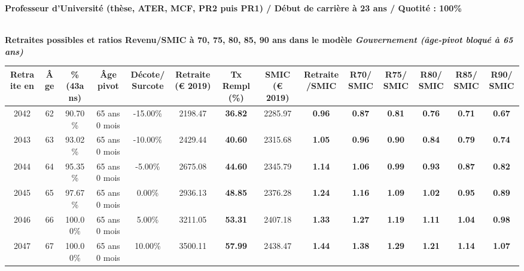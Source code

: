 {\bf \noindent Professeur d'Université (thèse, ATER, MCF, PR2 puis PR1) / Début de carrière à 23 ans / Quotité : 100\%}  ~ 

 ~\\{\bf \noindent Retraites possibles et ratios Revenu/SMIC à 70, 75, 80, 85, 90 ans dans le modèle \emph{Gouvernement (âge-pivot bloqué à 65 ans)}}  
 
\begin{adjustbox}{max width=\textwidth} 
\begin{tabular}[htb]{|c|c||c|c|c||c|c||c|c||c|c|c|c|c|} 
\hline 
 Retraite en &  Âge &  \%(43ans) &  Âge pivot &  Décote/Surcote &  Retraite (\euro{} 2019) &  Tx Rempl(\%) &  SMIC (\euro{} 2019) &  Retraite/SMIC &  R70/SMIC &  R75/SMIC &  R80/SMIC &  R85/SMIC &  R90/SMIC \\ 
\hline \hline 
 2042 &  62 &  90.70\% &  65 ans 0 mois &  -15.00\% &  2198.47 &  {\bf 36.82} &  2285.97 &  {\bf {\color{red} 0.96}} &  {\bf {\color{red} 0.87}} &  {\bf {\color{red} 0.81}} &  {\bf {\color{red} 0.76}} &  {\bf {\color{red} 0.71}} &  {\bf {\color{red} 0.67}} \\ 
\hline 
 2043 &  63 &  93.02\% &  65 ans 0 mois &  -10.00\% &  2429.44 &  {\bf 40.60} &  2315.68 &  {\bf 1.05} &  {\bf {\color{red} 0.96}} &  {\bf {\color{red} 0.90}} &  {\bf {\color{red} 0.84}} &  {\bf {\color{red} 0.79}} &  {\bf {\color{red} 0.74}} \\ 
\hline 
 2044 &  64 &  95.35\% &  65 ans 0 mois &  -5.00\% &  2675.08 &  {\bf 44.60} &  2345.79 &  {\bf 1.14} &  {\bf 1.06} &  {\bf {\color{red} 0.99}} &  {\bf {\color{red} 0.93}} &  {\bf {\color{red} 0.87}} &  {\bf {\color{red} 0.82}} \\ 
\hline 
 2045 &  65 &  97.67\% &  65 ans 0 mois &  0.00\% &  2936.13 &  {\bf 48.85} &  2376.28 &  {\bf 1.24} &  {\bf 1.16} &  {\bf 1.09} &  {\bf 1.02} &  {\bf {\color{red} 0.95}} &  {\bf {\color{red} 0.89}} \\ 
\hline 
 2046 &  66 &  100.00\% &  65 ans 0 mois &  5.00\% &  3211.05 &  {\bf 53.31} &  2407.18 &  {\bf 1.33} &  {\bf 1.27} &  {\bf 1.19} &  {\bf 1.11} &  {\bf 1.04} &  {\bf {\color{red} 0.98}} \\ 
\hline 
 2047 &  67 &  100.00\% &  65 ans 0 mois &  10.00\% &  3500.11 &  {\bf 57.99} &  2438.47 &  {\bf 1.44} &  {\bf 1.38} &  {\bf 1.29} &  {\bf 1.21} &  {\bf 1.14} &  {\bf 1.07} \\ 
\hline 
\hline 
\end{tabular} 
\end{adjustbox} 
 
